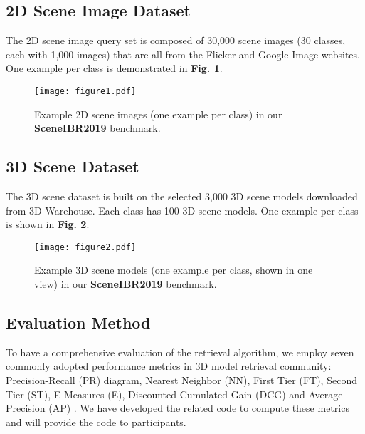 \documentclass[../main.tex]{subfiles}
\begin{document}
\subsection{2D Scene Image Dataset} The 2D scene image query set is composed of 30,000 scene images (30 classes, each with 1,000 images) that are all from the Flicker and Google Image websites. One example per class is demonstrated in \textbf{Fig. \ref{fig:1}}.

\begin{figure}[!htp]
	\centering
	\texttt{[image: figure1.pdf]}
	\caption{Example 2D scene images (one example per class) in our \textbf{SceneIBR2019} benchmark.}
	\label{fig:1}
\end{figure}

\subsection{3D Scene Dataset} The 3D scene dataset is built on the selected 3,000 3D scene models downloaded from 3D Warehouse. Each class has 100 3D scene models. One example per class is shown in \textbf{Fig. \ref{fig:2}}.

\begin{figure}[!htp]
	\centering
	\texttt{[image: figure2.pdf]}
	\caption{Example 3D scene models (one example per class, shown in one view) in our \textbf{SceneIBR2019} benchmark.}
	\label{fig:2}
\end{figure}

\subsection{Evaluation Method}
\label{sec:Evaluation}
To have a comprehensive evaluation of the retrieval algorithm, we employ seven commonly adopted performance metrics in 3D model retrieval community: Precision-Recall (PR) diagram, Nearest Neighbor (NN), First Tier (FT), Second Tier (ST), E-Measures (E), Discounted Cumulated Gain (DCG) and Average Precision (AP) \cite{CIVU}. We have developed the related code to compute these metrics and will provide the code to participants.
\end{document}

